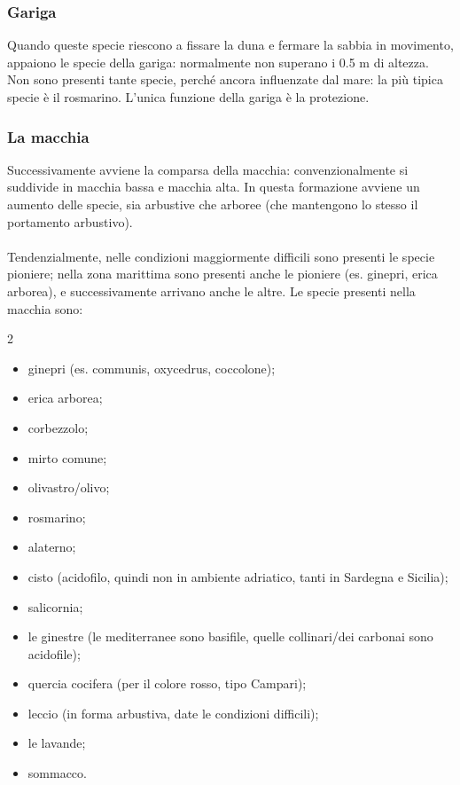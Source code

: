 \subsubsection{Gariga}
Quando queste specie riescono a fissare la duna e fermare la sabbia in movimento, appaiono le specie della gariga: normalmente non superano i 0.5 m di altezza. Non sono presenti tante specie, perché ancora influenzate dal mare: la più tipica specie è il rosmarino. L'unica funzione della gariga è la protezione.
\subsubsection{La macchia}
Successivamente avviene la comparsa della macchia: convenzionalmente si suddivide in macchia bassa e macchia alta. In questa formazione avviene un aumento delle specie, sia arbustive che arboree (che mantengono lo stesso il portamento arbustivo).\\
\\
Tendenzialmente, nelle condizioni maggiormente difficili sono presenti le specie pioniere; nella zona marittima sono presenti anche le pioniere (es. ginepri, erica arborea), e successivamente arrivano anche le altre. Le specie presenti nella macchia sono: 
\begin{multicols}{2}
\begin{itemize}[nosep]
    \item ginepri (es. communis, oxycedrus, coccolone);
    \item erica arborea;
    \item corbezzolo;
    \item mirto comune;
    \item olivastro/olivo;
    \item rosmarino;
    \item alaterno;
    \item cisto (acidofilo, quindi non in ambiente adriatico, tanti in Sardegna e Sicilia);
    \item salicornia;
    \item le ginestre (le mediterranee sono basifile, quelle collinari/dei carbonai sono acidofile);
    \item quercia cocifera (per il colore rosso, tipo Campari);
    \item leccio (in forma arbustiva, date le condizioni difficili);
    \item le lavande;
    \item sommacco.
\end{itemize}
\end{multicols}
